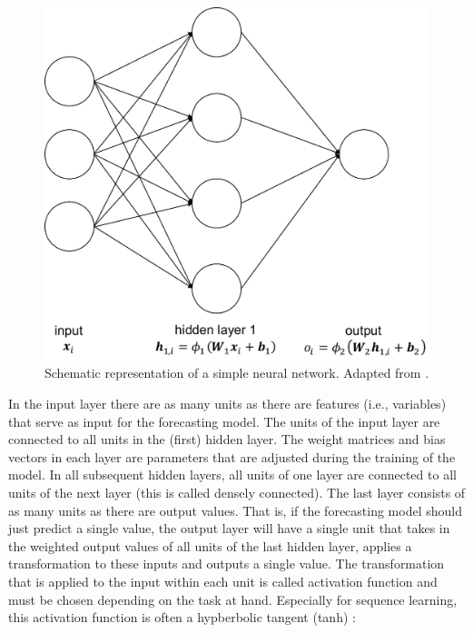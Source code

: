 \begin{figure}[htbp]
    \centering
    \includegraphics[scale=0.5]{thesis/figures/simpleNN.pdf}
    \caption[Schematic representation of a simple neural network]{Schematic representation of a simple neural network. Adapted from \citet{Gan:2017}.}
    \label{Fig:simpleNN}
\end{figure}

In the input layer there are as many units as there are features (i.e., variables) that serve as input for the forecasting model. The units of the input layer are connected to all units in the (first) hidden layer. The weight matrices and bias vectors in each layer are parameters that are adjusted during the training of the model. In all subsequent hidden layers, all units of one layer are connected to all units of the next layer (this is called densely connected). The last layer consists of as many units as there are output values. That is, if the forecasting model should just predict a single value, the output layer will have a single unit that takes in the weighted output values of all units of the last hidden layer, applies a transformation to these inputs and outputs a single value. The transformation that is applied to the input within each unit is called activation function and must be chosen depending on the task at hand. Especially for sequence learning, this activation function is often a hypberbolic tangent (tanh) \citep{Lipton:2015}:

